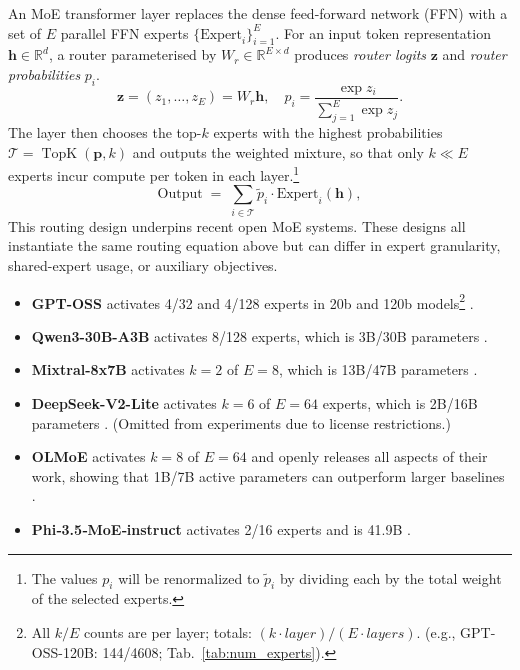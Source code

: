 \documentclass{article} %
\begin{document}
An MoE transformer layer replaces the dense feed-forward network (FFN) with a set of \(E\) parallel FFN experts
\(\{\text{Expert}_i\}_{i=1}^{E}\).
For an input token representation \(\mathbf h\in\mathbb{R}^{d}\), a router
parameterised by \(W_r\in\mathbb{R}^{E\times d}\) produces \emph{router logits} $\mathbf z$ and \emph{router probabilities} $p_i$.
\begin{equation}
  \mathbf z = (z_1,\dots,z_E)=W_r\mathbf h , \quad
  p_i = \frac{\exp z_i}{\sum_{j=1}^{E}\exp z_j}.
  \label{eq:router}
\end{equation}
The layer then chooses the top-\(k\) experts with the highest probabilities
\(\mathcal{T}=\operatorname{TopK}(\mathbf p,k)\)
and outputs the weighted mixture, so that only \(k\ll E\) experts incur compute per token in each layer.\footnote{The values $p_i$ will be renormalized to $\tilde{p}_i$ by dividing each by the total weight of the selected experts.}
\begin{equation}
  \text{Output} \;=\;
  \sum_{i\in\mathcal{T}} \tilde{p}_i \cdot \text{Expert}_i(\mathbf h),
  \label{eq:moe-output}
\end{equation}
This routing design underpins recent open MoE systems. These designs all instantiate the same routing equation above but can differ in expert granularity, shared-expert usage, or auxiliary objectives.
\begin{itemize}
  \item \textbf{GPT-OSS} activates 4/32 and 4/128 experts in 20b and 120b models\footnote{All $k/E$ counts are per layer; totals: $(k\cdot layer) / (E\cdot layers)$. (e.g., GPT-OSS-120B: 144/4608; Tab.~\ref{tab:num_experts}).} \citep{openai2025gptoss120bgptoss20bmodel}.
  \item \textbf{Qwen3-30B-A3B} activates 8/128 experts, which is 3B/30B parameters \citep{yang2025qwen3technicalreport}.
  \item \textbf{Mixtral-8x7B} activates \(k{=}2\) of \(E{=}8\), which is 13B/47B parameters \citep {jiang2024mixtralexperts}.
  \item \textbf{DeepSeek-V2-Lite} activates \(k{=}6\) of \(E{=}64\) experts, which is 2B/16B parameters \citep{deepseekai2024deepseekv2strongeconomicalefficient}. (Omitted from experiments due to license restrictions.)
  \item \textbf{OLMoE} activates \(k{=}8\) of \(E{=}64\) and openly releases all aspects of their work, showing that 1B/7B active parameters can outperform larger baselines \citep{muennighoff2025olmoeopenmixtureofexpertslanguage}.
  \item \textbf{Phi‑3.5‑MoE‑instruct} activates 2/16 experts and is 41.9B \citep{abdin2024phi3technicalreporthighly}.
\end{itemize}
\end{document}
